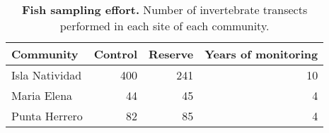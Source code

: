\begin{table}[t]

\caption{\label{tab:}{\bf Fish sampling effort.} Number of invertebrate transects performed in each site of each community.}
\centering
\begin{tabular}{lrrr}
\toprule
Community & Control & Reserve & Years of monitoring\\
\midrule
Isla Natividad & 400 & 241 & 10\\
Maria Elena & 44 & 45 & 4\\
Punta Herrero & 82 & 85 & 4\\
\bottomrule
\end{tabular}
\end{table}